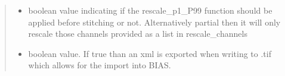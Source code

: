 \documentclass[a4paper,10pt,english,openany,oneside]{sphinxmanual}
\begin{document}
\begin{fulllineitems}
\begin{quote}
\begin{description}
\begin{itemize}
\item {} 
\sphinxAtStartPar
{} \textendash{} boolean value indicating if the rescale\_p1\_P99 function should be applied before stitching or not. Alternatively partial then it will only
rescale those channels provided as a list in rescale\_channels

\item {} 
\sphinxAtStartPar
{} \textendash{} boolean value. If true than an xml is exported when writing to .tif which allows for the import into BIAS.

\end{itemize}

\end{description}\end{quote}

\end{fulllineitems}

\end{document}
